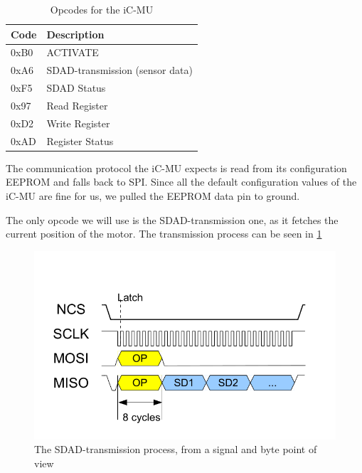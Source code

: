 \begin{table}[H]
    \begin{tabular}{|l|l|}
        \hline
        Code & Description                     \\ \hline
        0xB0 & ACTIVATE                        \\ \hline
        0xA6 & SDAD-transmission (sensor data) \\ \hline
        0xF5 & SDAD Status                     \\ \hline
        0x97 & Read Register                   \\ \hline
        0xD2 & Write Register                  \\ \hline
        0xAD & Register Status                 \\ \hline
    \end{tabular}
    \caption{Opcodes for the iC-MU}
    \label{tab:opcodes}
\end{table}

The communication protocol the iC-MU expects is read from its configuration EEPROM and falls back to SPI.
Since all the default configuration values of the iC-MU are fine for us, we pulled the EEPROM data pin to ground.

The only opcode we will use is the SDAD-transmission one, as it fetches the current position of the motor.
The transmission process can be seen in \ref{fig:background:sdad}

\begin{figure}[H]
    \includegraphics[width=.8\textwidth]{assets/sdad-transmission.png}
    \caption{The SDAD-transmission process, from a signal and byte point of view}
    \label{fig:background:sdad}
\end{figure}

